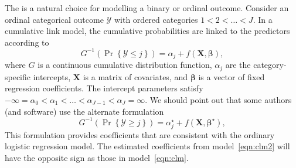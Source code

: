 The  is a natural choice for modelling a binary or ordinal outcome. Consider an ordinal categorical outcome $\mathcal{Y}$ with ordered categories $1 < 2 < \dots < J$. In a cumulative link model, the cumulative probabilities are linked to the predictors according to
\begin{equation}
\label{eqn:clm}
  G^{-1}\left(\Pr\left\{\mathcal{Y} \le j\right\}\right) = \alpha_j + f\left(\boldsymbol{X}, \boldsymbol{\beta}\right),
\end{equation}
where $G$ is a continuous cumulative distribution function, $\alpha_j$ are the category-specific intercepts, $\boldsymbol{X}$ is a matrix of covariates, and $\boldsymbol{\beta}$ is a vector of fixed regression coefficients. The intercept parameters satisfy $-\infty = \alpha_0 < \alpha_1 < \dots < \alpha_{J-1} < \alpha_J = \infty$. We should point out that some authors (and software) use the alternate formulation
\begin{equation}
\label{eqn:clm2}
  G^{-1}\left(\Pr\left\{\mathcal{Y} \ge j\right\}\right) = \alpha_j^\star + f\left(\boldsymbol{X}, \boldsymbol{\beta}^\star\right),
\end{equation}
This formulation provides coefficients that are consistent with the ordinary logistic regression model. The estimated coefficients from model~\eqref{eqn:clm2} will have the opposite sign as those in model~\eqref{eqn:clm}.

